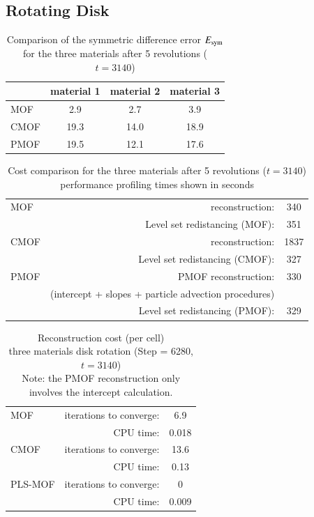 \documentclass[preprint,12pt]{Definitions/elsarticle}
\newcommand{\tn}{\textnormal}
\begin{document}
\FloatBarrier
\subsection{Rotating Disk}
\begin{table}[H]
	\centering	
	\caption{Comparison of the symmetric difference error $E_\tn{sym}$ for the three materials after 5 revolutions ($t=3140$)}
	\renewcommand{\arraystretch}{1.2} %
	\begin{tabular}{|l|c|c|c|}
		\hline
		& material 1   & material 2  & material 3
		\\ \hline 
		MOF & 2.9  & 2.7  & 3.9
		\\ \hline 
		CMOF & 19.3  & 14.0  & 18.9
		\\ \hline
		PMOF & 19.5 & 12.1   & 17.6
		\\ \hline
	\end{tabular}  
	\label{diskerror}	
\end{table}

\begin{table}[H]
	\centering	
	\caption{Cost comparison for the three materials after 5 revolutions ($t=3140$)\\
		performance profiling times shown in seconds}
	\renewcommand{\arraystretch}{1.1} %
	\begin{tabular}{|l|r|c|}
		\hline
		MOF& reconstruction: &340\\
		&Level set redistancing (MOF): &351
		\\ \hline 
		CMOF& reconstruction: &1837\\
		&Level set redistancing (CMOF): &327
		\\ \hline
		PMOF&PMOF reconstruction: &330\\
		&(intercept + slopes + particle advection procedures) & \\
		&Level set redistancing (PMOF): &329
		\\ \hline
	\end{tabular}  
	\label{diskcost}	
\end{table}

\begin{table}[H]
	\centering	
	\caption{Reconstruction cost (per cell)\\
		three materials disk rotation (Step = 6280, $t=3140$)\\
		Note: the PMOF reconstruction only involves the intercept calculation.
	}
	\renewcommand{\arraystretch}{1.1} %
	\begin{tabular}{|l|r|c|}
		\hline
		MOF& iterations to converge: &6.9\\
		&CPU time: &0.018
		\\ \hline 
		CMOF& iterations to converge: &13.6\\
		& CPU time: &0.13
		\\ \hline
		PLS-MOF& iterations to converge: &0\\
		& CPU time: &0.009
		\\ \hline
	\end{tabular}  
	\label{diskcost2}	
\end{table}
\end{document}
